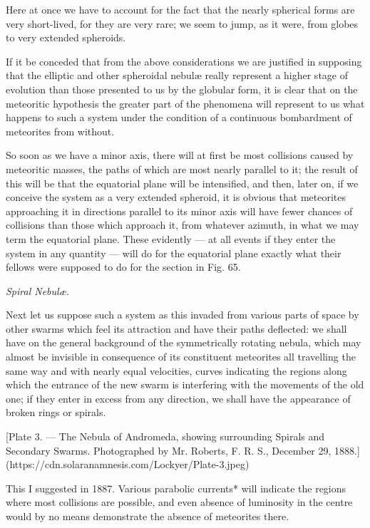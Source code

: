 \documentclass[a4paper, 12pt, oneside, polutonikogreek, english]{article}
\begin{document}
Here at once we have to account for the fact that the nearly spherical forms are very short-lived, for they are very rare; we seem to jump, as it were, from globes to very extended spheroids.

If it be conceded that from the above considerations we are justified in supposing that the elliptic and other spheroidal nebulæ really represent a higher stage of evolution than those presented to us by the globular form, it is clear that on the meteoritic hypothesis the greater part of the phenomena will represent to us what happens to such a system under the condition of a continuous bombardment of meteorites from without.

So soon as we have a minor axis, there will at first be most collisions caused by meteoritic masses, the paths of which are most nearly parallel to it; the result of this will be that the equatorial plane will be intensified, and then, later on, if we conceive the system as a very extended spheroid, it is obvious that meteorites approaching it in directions parallel to its minor axis will have fewer chances of collisions than those which approach it, from whatever azimuth, in what we may term the equatorial plane. These evidently --- at all events if they enter the system in any quantity --- will do for the equatorial plane exactly what their fellows were supposed to do for the section in Fig. 65.

\emph{Spiral Nebulæ.}

Next let us suppose such a system as this invaded from various parts of space by other swarms which feel its attraction and have their paths deflected: we shall have on the general background of the symmetrically rotating nebula, which may almost be invisible in consequence of its constituent meteorites all travelling the same way and with nearly equal velocities, curves indicating the regions along which the entrance of the new swarm is interfering with the movements of the old one; if they enter in excess from any direction, we shall have the appearance of broken rings or spirals.

[Plate 3. --- The Nebula of Andromeda, showing surrounding Spirals and Secondary Swarms. Photographed by Mr. Roberts, F. R. S., December 29, 1888.](https://cdn.solaranamnesis.com/Lockyer/Plate-3.jpeg)

This I suggested in 1887. Various parabolic currents* will indicate the regions where most collisions are possible, and even absence of luminosity in the centre would by no means demonstrate the absence of meteorites there.
\end{document}
